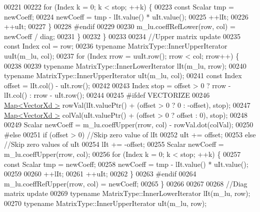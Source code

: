 \begin{DoxyCode}
00221 
00222                 \textcolor{keywordflow}{for} (Index k = 0; k < stop; ++k) \{
00223                     \textcolor{keyword}{const} Scalar tmp = newCoeff;
00224                     newCoeff = tmp - lIt.value() * uIt.value();
00225                     ++lIt;
00226                     ++uIt;
00227                 \}
00228 \textcolor{preprocessor}{#endif}
00229 
00230                 m\_lu.coeffRefLower(row, col) = newCoeff / diag;
00231             \}
00232         \}
00233 
00234         \textcolor{comment}{//Upper matrix update}
00235         \textcolor{keyword}{const} Index col = row;
00236         \textcolor{keyword}{typename} MatrixType::InnerUpperIterator uuIt(m\_lu, col);
00237         \textcolor{keywordflow}{for} (Index rrow = uuIt.row(); rrow < col; rrow++) \{
00238 
00239             \textcolor{keyword}{typename} MatrixType::InnerLowerIterator lIt(m\_lu, rrow);
00240             \textcolor{keyword}{typename} MatrixType::InnerUpperIterator uIt(m\_lu, col);
00241             \textcolor{keyword}{const} Index offset = lIt.col() - uIt.row();
00242 
00243             Index stop = offset > 0 ? rrow - lIt.col() : rrow - uIt.row();
00244 
00245 \textcolor{preprocessor}{#ifdef VECTORIZE}
00246             \hyperlink{group___core___module_class_eigen_1_1_map}{Map<VectorXd >} rowVal(lIt.valuePtr() + (offset > 0 ? 0 : -offset), stop);
00247             \hyperlink{group___core___module_class_eigen_1_1_map}{Map<VectorXd >} colVal(uIt.valuePtr() + (offset > 0 ? offset : 0), stop);
00248 
00249             Scalar newCoeff = m\_lu.coeffUpper(rrow, col) - rowVal.dot(colVal);
00250 \textcolor{preprocessor}{#else}
00251             \textcolor{keywordflow}{if} (offset > 0) \textcolor{comment}{//Skip zero value of lIt}
00252                 uIt += offset;
00253             \textcolor{keywordflow}{else} \textcolor{comment}{//Skip zero values of uIt}
00254                 lIt += -offset;
00255             Scalar newCoeff = m\_lu.coeffUpper(rrow, col);
00256             \textcolor{keywordflow}{for} (Index k = 0; k < stop; ++k) \{
00257                 \textcolor{keyword}{const} Scalar tmp = newCoeff;
00258                 newCoeff = tmp - lIt.value() * uIt.value();
00259 
00260                 ++lIt;
00261                 ++uIt;
00262             \}
00263 \textcolor{preprocessor}{#endif}
00264             m\_lu.coeffRefUpper(rrow, col) = newCoeff;
00265         \}
00266 
00267 
00268         \textcolor{comment}{//Diag matrix update}
00269         \textcolor{keyword}{typename} MatrixType::InnerLowerIterator lIt(m\_lu, row);
00270         \textcolor{keyword}{typename} MatrixType::InnerUpperIterator uIt(m\_lu, row);

\end{DoxyCode}
